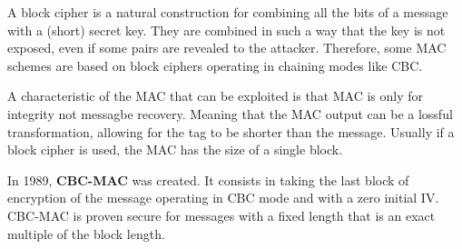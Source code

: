 A block cipher is a natural construction for combining all the bits of a message with a (short) secret key.
They are combined in such a way that the key is not exposed, even if some pairs are revealed to the attacker.
Therefore, some MAC schemes are based on block ciphers operating in chaining modes like CBC.

A characteristic of the MAC that can be exploited is that MAC is only for integrity not messagbe recovery.
Meaning that the MAC output can be a lossful transformation, allowing for the tag to be shorter than the message.
Usually if a block cipher is used, the MAC has the size of a single block.

In 1989, \textbf{CBC-MAC} was created.
It consists in taking the last block of encryption of the message operating in CBC mode and with a zero initial IV.
CBC-MAC is proven secure for messages with a fixed length that is an exact multiple of the block length.
